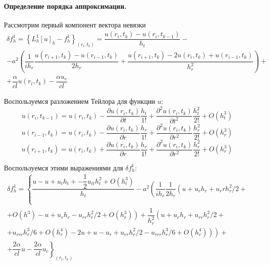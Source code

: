 \documentclass[a4paper,14pt,russian, fleqn]{extreport}
\begin{document}
 	\paragraph{Определение порядка аппроксимации.} Рассмотрим первый компонент вектора невязки
 	\begin{eqnarray}
 		\delta f^1_h = \left\{ L^1_h[u]_h - f^1_h \right\} _{(r_i, t_k)} = \dfrac{u(r_i, t_k) - u(r_i, t_{k-1})}{h_t} - \nonumber \\ - a^2\left( \dfrac{1}{ih_r}\dfrac{u(r_{i+1}, t_k) - u(r_{i-1}, t_k)}{2h_r} +\dfrac{u(r_{i+1}, t_k) - 2u(r_i, t_k) + u(r_{i-1}, t_k)}{h^2_r} \right) + \nonumber \\ + \dfrac{\alpha}{cl}u(r_i, t_k) - \dfrac{\alpha u_c}{cl}
 	\end{eqnarray}
 	
 	Воспользуемся разложением Тейлора для функции $u$:
 	\begin{equation*}
	 	u(r_i, t_{k-1}) = u(r_i, t_k) - \dfrac{\partial u(r_i, t_k)}{\partial t}\dfrac{h_t}{1!} + \dfrac{\partial^2 u(r_i, t_k)}{\partial t^2}\dfrac{h_t^2}{2!} + O(h_t^3)
 	\end{equation*}
 	\begin{equation*}
	 	u(r_{i-1}, t_{k}) = u(r_i, t_k) - \dfrac{\partial u(r_i, t_k)}{\partial r}\dfrac{h_r}{1!} + \dfrac{\partial^2 u(r_i, t_k)}{\partial r^2}\dfrac{h_r^2}{2!} + O(h_r^3)
 	\end{equation*}
 	\begin{equation*}
	 	u(r_{i+1}, t_{k}) = u(r_i, t_k) + \dfrac{\partial u(r_i, t_k)}{\partial r}\dfrac{h_r}{1!} + \dfrac{\partial^2 u(r_i, t_k)}{\partial r^2}\dfrac{h_r^2}{2!} + O(h_r^3)
 	\end{equation*}
 	
 	Воспользуемся этими выражениями для $\delta f_h^1$:
 	\begin{eqnarray}
 		\delta f^1_h = \left\{\dfrac{u - u + u_th_t + - \dfrac{1}{2}u_{tt}h_t^2 + O(h_t^3)}{h_t} - a^2 \left( \dfrac{1}{ih_r}\dfrac{1}{2h_r} \left( u + u_rh_r+u_rrh_r^2/2 +  \right. \right. \right. \nonumber \\
 		\left.+ O(h^3) - u + u_rh_r -u_{rr}h_r^2/2 + O(h_r^3)\right) + \dfrac{1}{h_r^2}\left( u + u_rh_r + u_{rr}h_r^2/2 + \right. \nonumber \\ \left.\left. +  u_{rrr}h_r^3/6 + O(h_r^4) - 2u + u - u_r + u_{rr}h_r^2/2 - u_{rrr}h_r^3/6 + O(h_r^4) \right)\right) + \nonumber \\
 		\left.+  \dfrac{2\alpha}{cl}u - \dfrac{2\alpha}{cl}u_c\right\}_{(r_i, t_k)} \nonumber
 	\end{eqnarray}
 	
\end{document}
